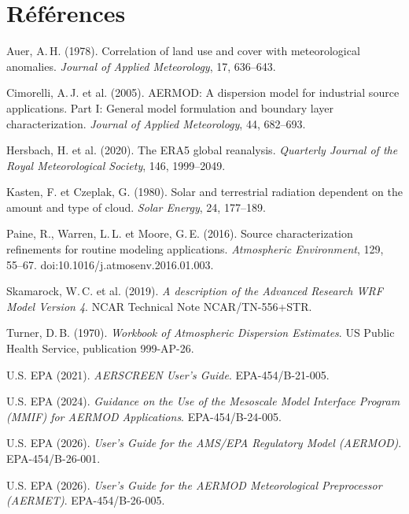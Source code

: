 \documentclass[11pt,a4paper]{article}
\begin{document}
\section*{Références}
\small
\begin{description}[leftmargin=0pt,labelindent=0pt,itemsep=1pt,font=\normalfont]
\item Auer, A.\,H. (1978). Correlation of land use and cover with meteorological anomalies. \textit{Journal of
Applied Meteorology}, 17, 636–643.
\item Cimorelli, A.\,J. et al. (2005). AERMOD: A dispersion model for industrial source applications. Part I:
General model formulation and boundary layer characterization. \textit{Journal of Applied Meteorology}, 44, 682–693.
\item Hersbach, H. et al. (2020). The ERA5 global reanalysis. \textit{Quarterly Journal of the Royal Meteorological
Society}, 146, 1999–2049.
\item Kasten, F. et Czeplak, G. (1980). Solar and terrestrial radiation dependent on the amount and type of cloud.
\textit{Solar Energy}, 24, 177–189.
\item Paine, R., Warren, L.\,L. et Moore, G.\,E. (2016). Source characterization refinements for routine modeling
applications. \textit{Atmospheric Environment}, 129, 55–67. doi:10.1016/j.atmosenv.2016.01.003.
\item Skamarock, W.\,C. et al. (2019). \textit{A description of the Advanced Research WRF Model Version 4}. NCAR
Technical Note NCAR/TN-556+STR.
\item Turner, D.\,B. (1970). \textit{Workbook of Atmospheric Dispersion Estimates}. US Public Health Service,
publication 999-AP-26.
\item U.S. EPA (2021). \textit{AERSCREEN User's Guide}. EPA-454/B-21-005.
\item U.S. EPA (2024). \textit{Guidance on the Use of the Mesoscale Model Interface Program (MMIF) for AERMOD
Applications}. EPA-454/B-24-005.
\item U.S. EPA (2026). \textit{User's Guide for the AMS/EPA Regulatory Model (AERMOD)}. EPA-454/B-26-001.
\item U.S. EPA (2026). \textit{User's Guide for the AERMOD Meteorological Preprocessor (AERMET)}. EPA-454/B-26-005.
\end{description}
\end{document}
